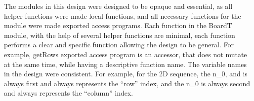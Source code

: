 \documentclass[12pt]{article}
\begin{document}
The modules in this design were designed to be opaque and essential, as all helper functions were made local functions, and all necessary functions for the module were made exported access programs. Each function in the BoardT module, with the help of several helper functions are minimal, each function performs a clear and specific function allowing the design to be general. For example, getRows exported access program is an accessor, that does not mutate at the same time, while having a descriptive function name. The variable names in the design were consistent. For example, for the 2D sequence, the n\_0, and is always first and always represents the ``row'' index, and the n\_0 is always second and always represents the ``column'' index.\\
\end{document}
